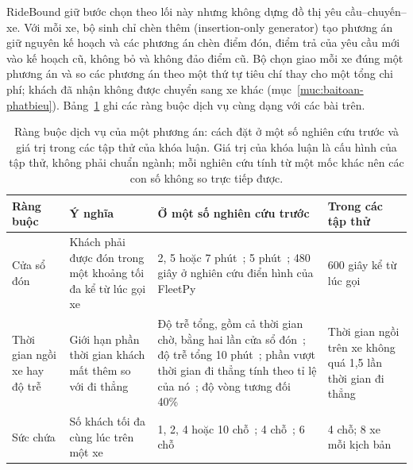 RideBound giữ bước chọn theo lối này nhưng không dựng đồ thị yêu cầu--chuyến--xe. Với mỗi xe, bộ sinh chỉ chèn thêm
(insertion-only generator) tạo phương án giữ nguyên kế hoạch và các phương án chèn điểm đón, điểm trả của yêu cầu mới
vào kế hoạch cũ, không bỏ và không đảo điểm cũ. Bộ chọn giao mỗi xe đúng một phương án và so các phương án theo một
thứ tự tiêu chí thay cho một tổng chi phí; khách đã nhận không được chuyển sang xe khác
(mục~\ref{muc:baitoan-phatbieu}). Bảng~\ref{bang:c2-dichvu} ghi các ràng buộc dịch vụ cùng dạng với các bài trên.

\begin{table}[htbp]
\centering
\caption{Ràng buộc dịch vụ của một phương án: cách đặt ở một số nghiên cứu trước và giá trị trong các tập thử của
khóa luận. Giá trị của khóa luận là cấu hình của tập thử, không phải chuẩn ngành; mỗi nghiên cứu tính từ một mốc
khác nên các con số không so trực tiếp được.}
\label{bang:c2-dichvu}
\small
\begin{tabular}{@{}p{2.4cm}p{3.4cm}p{5.9cm}p{3.1cm}@{}}
\toprule
\textbf{Ràng buộc} & \textbf{Ý nghĩa} & \textbf{Ở một số nghiên cứu trước} & \textbf{Trong các tập thử}\\
\midrule
Cửa sổ đón & Khách phải được đón trong một khoảng tối đa kể từ lúc gọi xe & 2, 5 hoặc 7
phút~\cite{alonsomora2017}; 5 phút~\cite{fielbaum2020,elmi2026}; 480 giây ở nghiên cứu điển hình của
FleetPy~\cite{engelhardt2026} & 600 giây kể từ lúc gọi\\
Thời gian ngồi xe hay độ trễ & Giới hạn phần thời gian khách mất thêm so với đi thẳng & Độ trễ tổng, gồm cả thời gian
chờ, bằng hai lần cửa sổ đón~\cite{alonsomora2017}; độ trễ tổng 10 phút~\cite{fielbaum2020,elmi2026}; phần vượt thời
gian đi thẳng tính theo tỉ lệ của nó~\cite{molenbruch2017}; độ vòng tương đối 40\%~\cite{engelhardt2026} & Thời gian
ngồi trên xe không quá 1,5 lần thời gian đi thẳng\\
Sức chứa & Số khách tối đa cùng lúc trên một xe & 1, 2, 4 hoặc 10 chỗ~\cite{alonsomora2017}; 4
chỗ~\cite{engelhardt2026}; 6 chỗ~\cite{schulz2026} & 4 chỗ; 8 xe mỗi kịch bản\\
\bottomrule
\end{tabular}
\end{table}

